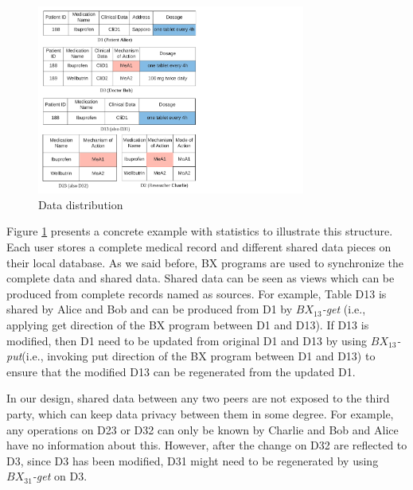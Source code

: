 \documentclass[conference]{IEEEtran}
\begin{document}
\begin{figure}[htbp]
	\centerline{\includegraphics[width=250pt]{medicalData.pdf}}
	\caption{Data distribution}
	\label{dataRepresentation}
\end{figure}

Figure \ref{dataRepresentation} presents a concrete example with statistics to illustrate this structure. Each user stores a complete medical record and different shared data pieces on their local database.
As we said before, BX programs are used to synchronize the complete data and shared data. Shared data can be seen as views which can be produced from complete records named as sources. For example, Table D13 is shared by Alice and Bob and can be produced from D1 by \emph{$BX_{13}$-get} (i.e., applying get direction of the BX program between D1 and D13). If D13 is modified, then D1 need to be updated from original D1 and D13 by using  \emph{$BX_{13}$-put}(i.e., invoking put direction of the BX program between D1 and D13) to ensure that the modified D13 can be regenerated from the updated D1.  

In our design, shared data between any two peers are not exposed to the third party, which can keep data privacy between them in some degree. For example, any operations on D23 or D32 can only be known by Charlie and Bob and Alice have no information about this. However, after the change on D32 are reflected to D3, since D3 has been modified, D31 might need to be regenerated by using \emph{$BX_{31}$-get} on D3.


%
%
%
\end{document}
